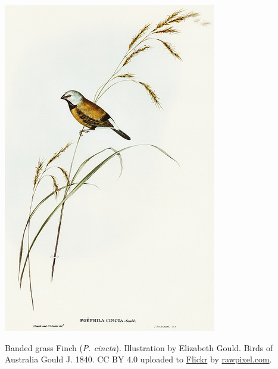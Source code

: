 
\begin{marginfigure}
\begin{center}
\includegraphics[width=\textwidth]{illustration_images/Genetic_drift/Poephila_cincta_finch/Poephila_cincta_finch.png}
\end{center}
\caption{Banded grass Finch ({\it P. cincta}). Illustration by
  Elizabeth Gould.
  \newline \noindent \tiny{Birds of Australia Gould J. 1840. CC BY 4.0 uploaded to \href{https://www.flickr.com/photos/vintage_illustration/41073432105/in/photolist-WpHYmR-WBF2Uc-Uoq2kW-QAW9bN-UL33uh-RmyMxt-PKmBjN-8xpKmQ-8xmHg2-H6mfAS-dVREvC-7Qepuh-222xkPQ-7QepzS-25zw6ak-W28Nyk-Qa6d32-ijh2uH-6V8Srd-25zw5ov-8xpKB7-nUQ33T-6V8TLy-nV88oH-25RuYmq-21TcFz1-R2Gdy4-GdWRgi-GdMmry-GdWAwD-9mjwfA-25oHWeJ-HMbQre-6CQWTH-7TjKu-e6SYV-25RuXU3-pdKtxc-9hYCzE-voj7Sj-zqSdQb-6SNmDE-a1datx-a1dasZ-PFfPXY-rR7QYw-GJ7rey-6SJmuB-7TjFh}{Flickr} by \url{rawpixel.com}.}} \label{fig:Poephila_cincta}
\end{marginfigure}

